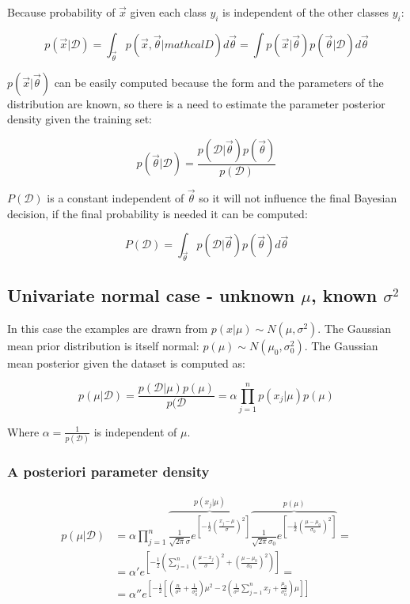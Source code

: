 	Because probability of $\vec{x}$ given each class $y_i$ is independent of the other classes $y_i$:

	$$p(\vec{x}|\mathcal{D}) = \int_{\vec{\theta}} p(\vec{x}, \vec{\theta}|mathcal{D})d\vec{\theta} =\int p(\vec{x}|\vec{\theta})p(\vec{\theta}|\mathcal{D})d\vec{\theta}$$

	$p(\vec{x}|\vec{\theta})$ can be easily computed because the form and the parameters of the distribution are known, so there is a need to estimate the parameter posterior density given the training set:

	$$p(\vec{\theta}|\mathcal{D}) = \frac{p(\mathcal{D}|\vec{\theta})p(\vec{\theta})}{p(\mathcal{D})}$$

	$P(\mathcal{D})$ is a constant independent of $\vec{\theta}$ so it will not influence the final Bayesian decision, if the final probability is needed it can be computed:

	$$P(\mathcal{D}) = \int_{\vec{\theta}}p(\mathcal{D}|\vec{\theta})p(\vec{\theta})d\vec{\theta}$$

	\subsection{Univariate normal case - unknown $\mu$, known $\sigma^2$}
	In this case the examples are drawn from $p(x|\mu)\sim N(\mu, \sigma^2)$.
	The Gaussian mean prior distribution is itself normal: $p(\mu) \sim N(\mu_0, \sigma^2_0)$.
	The Gaussian mean posterior given the dataset is computed as:

	$$p(\mu|\mathcal{D}) = \frac{p(\mathcal{D}|\mu)p(\mu)}{p(\mathcal{D}} = \alpha\prod\limits_{j=1}^np(x_j|\mu)p(\mu)$$

	Where $\alpha = \frac{1}{p(\mathcal{D})}$ is independent of $\mu$.

		\subsubsection{A posteriori parameter density}

		\begin{align*}
			p(\mu|\mathcal{D}) &= \alpha\prod\limits_{j = 1}^n\overbrace{\frac{1}{\sqrt{2\pi}\sigma}e^{[-\frac{1}{2}(\frac{x_j-\mu}{\sigma})^2]}}^{p(x_j|\mu)}\overbrace{\frac{1}{\sqrt{2\pi}\sigma_0}e^{[-\frac{1}{2}(\frac{\mu-\mu_0}{\sigma_0})^2]}}^{p(\mu)} =\\
												&=\alpha'e^{[-\frac{1}{2}(\sum\limits_{j=1}^n(\frac{\mu-x_j}{\sigma})^2+(\frac{\mu-\mu_0}{\sigma_0})^2)]} =\\
												&=\alpha''e^{[-\frac{1}{2}[(\frac{n}{\sigma^2}+\frac{1}{\sigma^2_0})\mu^2 - 2(\frac{1}{\sigma^2}\sum\limits_{j=1}^nx_j + \frac{\mu_0}{\sigma^2_0})\mu]]}
		\end{align*}

